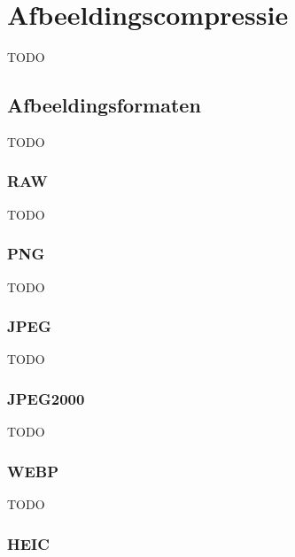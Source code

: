 \chapter{Afbeeldingscompressie}
\label{ch:afbeeldingscompressie}

TODO


\section{Afbeeldingsformaten}
\label{sec:afbeeldingscompressie-afbeeldingsformaten}

TODO

\subsection{RAW}
\label{sec:afbeeldingscompressie-raw}

TODO

\subsection{PNG}
\label{sec:afbeeldingscompressie-png}

TODO

\subsection{JPEG}
\label{sec:afbeeldingscompressie-jpeg}

TODO

\subsection{JPEG2000}
\label{sec:afbeeldingscompressie-jpeg2000}

TODO

\subsection{WEBP}
\label{sec:afbeeldingscompressie-webp}

TODO

\subsection{HEIC}
\label{sec:afbeeldingscompressie-heic}

